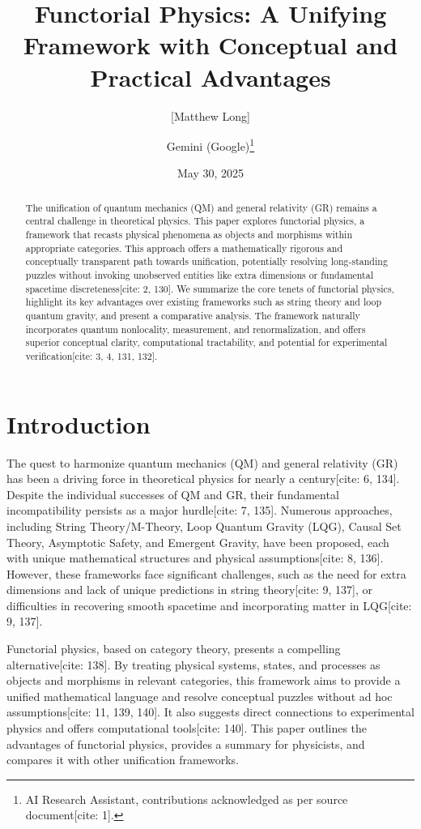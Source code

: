 \documentclass[11pt,a4paper]{article}
\title{Functorial Physics: A Unifying Framework with Conceptual and Practical Advantages}
\author[1]{[Matthew Long]}
\author[2]{Gemini (Google)\thanks{AI Research Assistant, contributions acknowledged as per source document[cite: 1].}}
\affil[1]{Google (Research Assistant)}
\affil[2]{Magneton Labs [Chicago]}
\date{May 30, 2025} %
\begin{document}
\maketitle

\begin{abstract}
The unification of quantum mechanics (QM) and general relativity (GR) remains a central challenge in theoretical physics. This paper explores functorial physics, a framework that recasts physical phenomena as objects and morphisms within appropriate categories. This approach offers a mathematically rigorous and conceptually transparent path towards unification, potentially resolving long-standing puzzles without invoking unobserved entities like extra dimensions or fundamental spacetime discreteness[cite: 2, 130]. We summarize the core tenets of functorial physics, highlight its key advantages over existing frameworks such as string theory and loop quantum gravity, and present a comparative analysis. The framework naturally incorporates quantum nonlocality, measurement, and renormalization, and offers superior conceptual clarity, computational tractability, and potential for experimental verification[cite: 3, 4, 131, 132].
\end{abstract}

\section{Introduction}
The quest to harmonize quantum mechanics (QM) and general relativity (GR) has been a driving force in theoretical physics for nearly a century[cite: 6, 134]. Despite the individual successes of QM and GR, their fundamental incompatibility persists as a major hurdle[cite: 7, 135]. Numerous approaches, including String Theory/M-Theory, Loop Quantum Gravity (LQG), Causal Set Theory, Asymptotic Safety, and Emergent Gravity, have been proposed, each with unique mathematical structures and physical assumptions[cite: 8, 136]. However, these frameworks face significant challenges, such as the need for extra dimensions and lack of unique predictions in string theory[cite: 9, 137], or difficulties in recovering smooth spacetime and incorporating matter in LQG[cite: 9, 137].

Functorial physics, based on category theory, presents a compelling alternative[cite: 138]. By treating physical systems, states, and processes as objects and morphisms in relevant categories, this framework aims to provide a unified mathematical language and resolve conceptual puzzles without ad hoc assumptions[cite: 11, 139, 140]. It also suggests direct connections to experimental physics and offers computational tools[cite: 140]. This paper outlines the advantages of functorial physics, provides a summary for physicists, and compares it with other unification frameworks.
\end{document}
